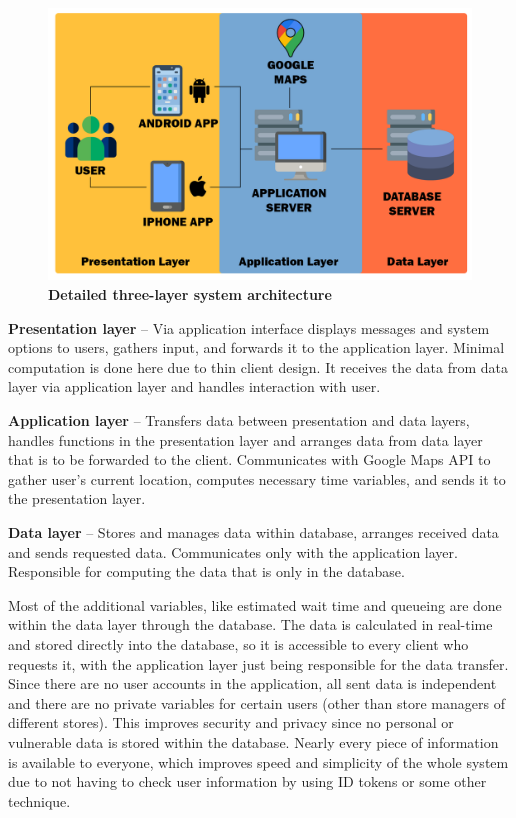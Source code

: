 \begin{figure}[!h]
\centering
\includegraphics[width=\textwidth]{Images/DetailedArchitecturev2}
\caption{\label{fig:detailedarch}\textbf{Detailed three-layer system architecture}}
\end{figure}


\textbf{Presentation layer} – Via application interface displays messages and system options to users, gathers input, and forwards it to the application layer. Minimal computation is done here due to thin client design. It receives the data from data layer via application layer and handles interaction with user. \newline

\textbf{Application layer} – Transfers data between presentation and data layers, handles functions in the presentation layer and arranges data from data layer that is to be forwarded to the client. Communicates with Google Maps API to gather user’s current location, computes necessary time variables, and sends it to the presentation layer.  \newline

\textbf{Data layer} – Stores and manages data within database, arranges received data and sends requested data. Communicates only with the application layer. Responsible for computing the data that is only in the database.  \newline

  

Most of the additional variables, like estimated wait time and queueing are done within the data layer through the database. The data is calculated in real-time and stored directly into the database, so it is accessible to every client who requests it, with the application layer just being responsible for the data transfer. Since there are no user accounts in the application, all sent data is independent and there are no private variables for certain users (other than store managers of different stores). This improves security and privacy since no personal or vulnerable data is stored within the database. Nearly every piece of information is available to everyone, which improves speed and simplicity of the whole system due to not having to check user information by using ID tokens or some other technique. 

